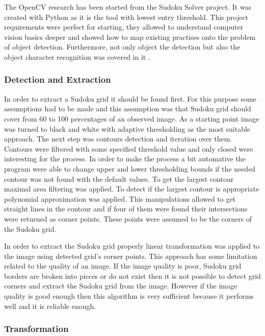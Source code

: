 \documentclass[../../main]{subfiles}
\begin{document}
The \ac{OpenCV} research has been started from the Sudoku Solver project. It was created with Python as it is the tool with lowest entry threshold. This project requirements were perfect for starting, they allowed to understand computer vision basics deeper and showed how to map existing practises onto the problem of object detection. Furthermore, not only object the detection but also the object character recognition was covered in it \cite{sudoku_solver_zakharov}. 

\subsubsection{Detection and Extraction}

In order to extract a Sudoku grid it should be found first. For this purpose some assumptions had to be made and this assumption was that Sudoku grid should cover from 60 to 100 percentages of an observed image. As a starting point image was turned to black and white with adaptive thresholding as the most suitable approach. The next step was contours detection and iteration over them. Contours were filtered with some specified threshold value and only closed were interesting for the process. In order to make the process a bit automative the program were able to change upper and lower thresholding bounds if the needed contour was not found with the default values. To get the largest contour maximal area filtering was applied. To detect if the largest contour is appropriate polynomial approximation was applied. This manipulations allowed to get straight lines in the contour and if four of them were found their intersections were returned as corner points. These points were assumed to be the corners of the Sudoku grid.

In order to extract the Sudoku grid properly linear transformation was applied to the image using detected grid's corner points.
This approach has some limitation related to the quality of an image. If the image quality is poor, Sudoku grid borders are broken into pieces or do not exist then it is not possible to detect grid corners and extract the Sudoku grid from the image. However if the image quality is good enough then this algorithm is very sufficient because it performs well and it is reliable enough.

\subsubsection{Transformation}
\end{document}
